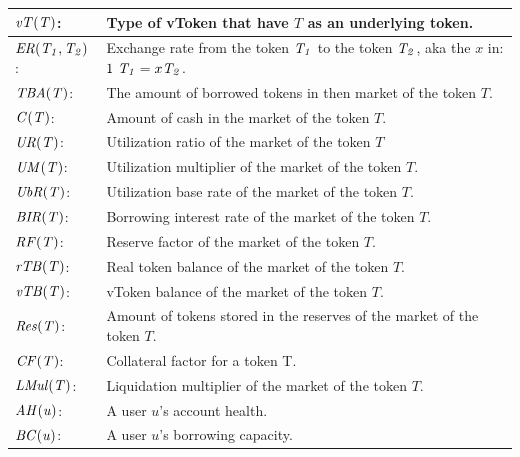 \newcommand\USA[2]{\mathit{USA(#1, #2)}}
\newcommand\UBA[2]{\mathit{USA(#1, #2)}}

\newcommand\TSAV[1]{\mathit{TSAV(#1)}}
\newcommand\TBAV[1]{\mathit{TBAV(#1)}}
\newcommand\uvTA[2]{\mathit{uvTA(#1, #2)}}

\newcommand\IND[2]{\mathit{Ind(#1, #2)}}
\newcommand\INDL[1]{\mathit{Indl(#1)}}
\newcommand\AI[1]{\mathit{AI(#1)}}
\newcommand\SIF[1]{\mathit{SIF(#1)}}

\begin{tabularx}{\linewidth}{|l X|}\hline
  $\mathit{vT(T)}$: & Type of vToken that have $T$ as an underlying token. \\\hline

  $\mathit{ER(\mathit{T_{1}}, \mathit{T_{2}})}$: & Exchange rate from the token $\mathit{T_{1}}$ to the token $\mathit{T_{2}}$, aka the $x$ in: $1\ \mathit{T_{1}} = x \mathit{T_{2}}$. \\\hline

  $\mathit{TBA(T)}$: & The amount of borrowed tokens in then market of the token $T$. \\\hline
  $\mathit{C(T)}$: & Amount of cash in the market of the token $T$. \\\hline

  $\mathit{UR(T)}$: & Utilization ratio of the market of the token $T$ \\\hline
  $\mathit{UM(T)}$: & Utilization multiplier of the market of the token $T$. \\\hline
  $\mathit{UbR(T)}$: & Utilization base rate of the market of the token $T$. \\\hline
  $\mathit{BIR(T)}$: & Borrowing interest rate of the market of the token $T$. \\\hline
  $\mathit{RF(T)}$: & Reserve factor of the market of the token $T$. \\\hline

  $\mathit{rTB(T)}$: & Real token balance of the market of the token $T$. \\\hline
  $\mathit{vTB(T)}$: & vToken balance of the market of the token $T$. \\\hline
  $\mathit{Res(T)}$: & Amount of tokens stored in the reserves of the market of the token $T$. \\\hline

  $\mathit{CF(T)}$: & Collateral factor for a token T. \\\hline
  $\mathit{LMul(T)}$: & Liquidation multiplier of the market of the token $T$. \\\hline
  $\mathit{AH(u)}$: & A user $u$'s account health. \\\hline
  $\mathit{BC(u)}$: & A user $u$'s borrowing capacity. \\\hline
  

\end{tabularx}
